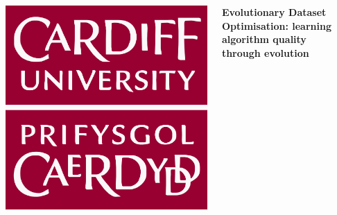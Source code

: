 \documentclass{beamer}
\begin{document}

\begin{columns}
    \begin{column}{0.1\textwidth}
        \vspace{2em}

        \centering%
        \includegraphics[width=\linewidth]{img/cu_logo}
    \end{column}

    \begin{column}{0.75\textwidth}
        \vspace{2em}
        \centering%
        \textbf{%
            \fontsize{60}{72}\selectfont Evolutionary Dataset Optimisation:
            learning algorithm quality through evolution
        }
    \end{column}

    \begin{column}{0.1\textwidth}
    \end{column}
\end{columns}

\vspace{2em}

\end{document}
